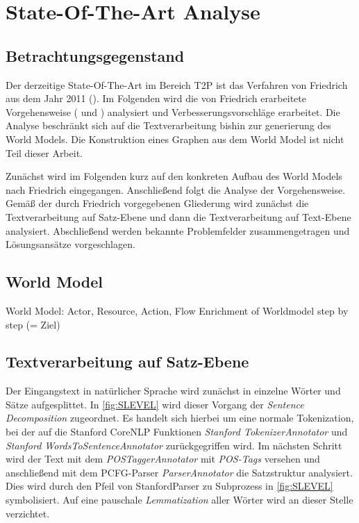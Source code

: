 \section{State-Of-The-Art Analyse}

\subsection{Betrachtungsgegenstand}
Der derzeitige State-Of-The-Art im Bereich \ac{T2P} ist das Verfahren von Friedrich aus dem Jahr 2011 (\cite[vgl.][11]{RIEFER}). Im Folgenden wird die von Friedrich erarbeitete Vorgehensweise (\cite[vgl.][11]{FRIEDRICH1} und \cite[vgl.][11]{FRIEDRICH2}) analysiert und Verbesserungsvorschläge erarbeitet.
Die Analyse beschränkt sich auf die Textverarbeitung bishin zur generierung des World Models. Die Konstruktion eines Graphen aus dem World Model ist nicht Teil dieser Arbeit.
\par
Zunächst wird im Folgenden kurz auf den konkreten Aufbau des World Models nach Friedrich eingegangen. Anschließend folgt die Analyse der Vorgehensweise. Gemäß der durch Friedrich vorgegebenen Gliederung wird zunächst die Textverarbeitung auf Satz-Ebene und dann die Textverarbeitung auf Text-Ebene analysiert. Abschließend werden bekannte Problemfelder zusammengetragen und Lösungsansätze vorgeschlagen.

\subsection{World Model}
World Model: Actor, Resource, Action, Flow
Enrichment of Worldmodel step by step
(= Ziel)

\subsection{Textverarbeitung auf Satz-Ebene}

Der Eingangstext in natürlicher Sprache wird zunächst in einzelne Wörter und Sätze aufgesplittet. In \ref{fig:SLEVEL} wird dieser Vorgang der \textit{Sentence Decomposition} zugeordnet. Es handelt sich hierbei um eine normale Tokenization, bei der auf die Stanford CoreNLP Funktionen \textit{Stanford TokenizerAnnotator} und \textit{Stanford WordsToSentenceAnnotator} zurückgegriffen wird. Im nächsten Schritt wird der Text mit dem \textit{POSTaggerAnnotator} mit \textit{POS-Tags} versehen und anschließend mit dem PCFG-Parser \textit{ParserAnnotator} die Satzstruktur analysiert. Dies wird durch den Pfeil von StanfordParser zu Subprozess in \ref{fig:SLEVEL} symbolisiert. Auf eine pauschale \textit{Lemmatization} aller Wörter wird an dieser Stelle verzichtet.

